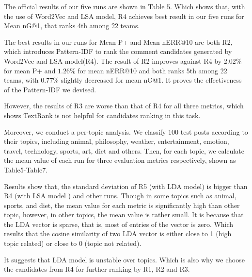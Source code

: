 \documentclass{sig-alternate}
\begin{document}
The official results of our five runs are shown in Table 5. Which shows 
that, with the use of Word2Vec and LSA model, R4 achieves 
best result in our five runs for Mean nG@1, that ranks 4th among 22 teams. 

The best results in our runs for Mean P+ and Mean nERR@10 are both R2, 
which introduces Pattern-IDF to rank the comment candidates generated by 
Word2Vec and LSA model(R4). The result of R2 improves against R4 by $2.02\%$ for mean P+ and $1.26\%$ for mean nERR@10 and both ranks 5th among 22 teams, with $0.77\%$ slightly decreased for mean nG@1. It proves the 
effectiveness of the Pattern-IDF we devised. 

However, the results of R3 are worse than that of R4 for all three metrics, 
which shows TextRank is not helpful for candidates ranking in this task.


Moreover, we conduct a per-topic analysis. We classify 100 test posts according to their topics, including animal, philosophy, weather, entertainment, emotion, travel, technology, sports, art, diet and others. Then, for each topic, we calculate the mean value of each run for three evaluation metrics respectively, shown as Table5-Table7. 

Results show that, the standard deviation of R5 (with LDA model) is bigger than R4 (with LSA model ) and other runs.  
Though in some topics such as animal, sports, and diet, the 
mean value for each metric is significantly high than other topic, however, in other topics, the mean value is rather small. It is because that the LDA vector is sparse, that is, most of entries of the vector is zero. Which results that the cosine similarity of two LDA vector is either close to 1 (high topic related) or close to 0 (topic not related).

It suggests that LDA model is unstable over topics. Which is also why we choose the candidates from R4 for further ranking by R1, R2 and R3.  
\end{document}
